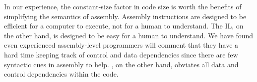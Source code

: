 In our experience, the constant-size factor in code size is worth the
benefits of simplifying the semantics of assembly.  Assembly
instructions are designed to be efficient for a computer to execute,
not for a human to understand. The IL, on the other hand, is designed
to be easy for a human to understand.  We have found even experienced
assembly-level programmers will comment that they have a hard time
keeping track of control and data dependencies since there are few
syntactic cues in assembly to help. \bap, on the other hand, obviates
all data and control dependencies within the code. 

